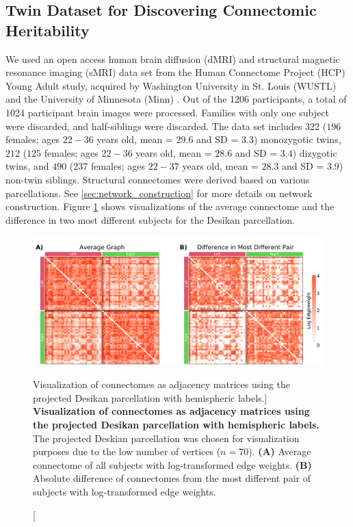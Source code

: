 
\subsection{Twin Dataset for Discovering Connectomic Heritability}
We used an open access human brain diffusion (dMRI) and structural magnetic resonance imaging (sMRI) data set from the Human Connectome Project (HCP) Young Adult study, acquired by Washington University in St. Louis (WUSTL) and the University of Minnesota (Minn) \cite{hcp1, hcp2}. Out of the 1206 participants, a total of 1024 participant brain images were processed. Families with only one subject were discarded, and half-siblings were discarded. The data set includes 322 ($196$ females; ages $22-36$ years old, mean = $29.6$ and SD = $3.3$) monozygotic twins, $212$ ($125$ females; ages $22-36$ years old, mean = $28.6$ and SD = $3.4$) dizygotic twins, and $490$ ($237$ females; ages $22-37$ years old, mean = $28.3$ and SD = $3.9$) non-twin siblings. Structural connectomes were derived based on various parcellations. See \ref{sec:network_construction} for more details on network construction. Figure \ref{fig:data} shows visualizations of the average connectome and the difference in two most different subjects for the Desikan parcellation. 

\begin{figure}
    \centering
    \includegraphics[width=\linewidth]{figures/herit/3-composite.pdf}
    \caption
    [Visualization of connectomes as adjacency matrices using the projected Desikan parcellation with hemispheric labels.]
    {\textbf{Visualization of connectomes as adjacency matrices using the projected Desikan parcellation with hemispheric labels.}  The projected Deskian parcellation was chosen for visualization purposes due to the low number of vertices ($n=70$). 
    \textbf{(A)} Average connectome of all subjects with log-transformed edge weights. 
    \textbf{(B)} Absolute difference of connectomes from the most different pair of subjects with log-transformed edge weights.}
    \label{fig:data}
\end{figure}

